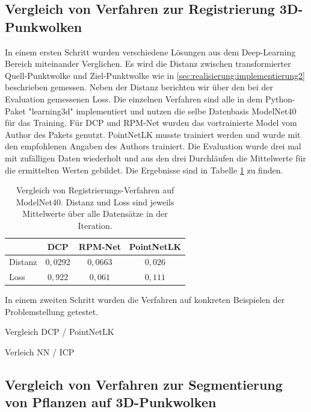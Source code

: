 \documentclass[12pt,titlepage, twoside]{article}
\begin{document}
\subsection{Vergleich von Verfahren zur Registrierung 3D-Punkwolken}

In einem ersten Schritt wurden verschiedene Lösungen aus dem Deep-Learning Bereich miteinander Verglichen. 
Es wird die Distanz zwischen transformierter Quell-Punktwolke und Ziel-Punktwolke wie in \ref{sec:realisierung:implementierung2} beschrieben gemessen. Neben der Distanz berichten wir über den bei der Evaluation gemessenen Loss.
Die einzelnen Verfahren sind alle in dem Python-Paket "learning3d" implementiert und nutzen die selbe Datenbasis ModelNet40 für das Training. Für DCP und RPM-Net wurden das vortrainierte Model vom Author des Pakets genutzt.
PointNetLK musste trainiert werden und wurde mit den empfohlenen Angaben des Authors trainiert. Die Evaluation wurde drei mal mit zufälligen Daten wiederholt und aus den drei Durchläufen die Mittelwerte für die ermittelten Werten gebildet.
Die Ergebnisse sind in Tabelle \ref{tab:registration:deeplearn:compare} zu finden.

\begin{table}
\begin{center}
\begin{tabular}{|l || c | c | c | } 
    \hline
     & DCP & RPM-Net & PointNetLK \\  
    \hline
    \hline
    Distanz & $0,0292$ & $0,0663$& $0,026$\\
    \hline
    Loss & $0,922$& $0,061$& $0,111$\\
    \hline
\end{tabular}
\end{center}
\caption{Vergleich von Registrierungs-Verfahren auf ModelNet40. Distanz und Loss sind jeweils Mittelwerte über alle Datensätze in der Iteration.}
\label{tab:registration:deeplearn:compare}
\end{table}

In einem zweiten Schritt wurden die Verfahren auf konkreten Beispielen der Problemstellung getestet. 

Vergleich DCP /  PointNetLK

Verleich NN / ICP

\subsection{Vergleich von Verfahren zur Segmentierung von Pflanzen auf 3D-Punkwolken}
\end{document}
